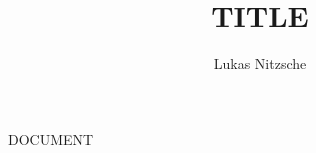 \documentclass[12pt, letterpaper, twoside]{article}
\title{TITLE}
\author{Lukas Nitzsche}
\date{}
\begin{document}
\begin{titlepage}
\maketitle
\end{titlepage}

DOCUMENT 
\end{document}
